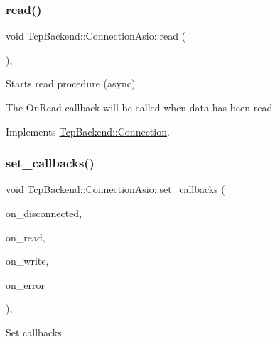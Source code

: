 \subsubsection{\texorpdfstring{read()}{read()}}
{\footnotesize\ttfamily void Tcp\+Backend\+::\+Connection\+Asio\+::read (\begin{DoxyParamCaption}{ }\end{DoxyParamCaption})\hspace{0.3cm}{\ttfamily [override]}, {\ttfamily [virtual]}}



Starts read procedure (async) 

The On\+Read callback will be called when data has been read. 

Implements \hyperlink{classTcpBackend_1_1Connection_a53c7544a1dc738fbf69d8081742f319c}{Tcp\+Backend\+::\+Connection}.

\mbox{\label{classTcpBackend_1_1ConnectionAsio_aee6f9ded99c8382d3daaf2aa3d8890ee}} 
\subsubsection{\texorpdfstring{set\+\_\+callbacks()}{set\_callbacks()}}
{\footnotesize\ttfamily void Tcp\+Backend\+::\+Connection\+Asio\+::set\+\_\+callbacks (\begin{DoxyParamCaption}\item[{const \hyperlink{namespaceTcpBackend_a2ce9b1a1f46bfa6c4b1ad38c8aa262a6}{On\+Disconnected} \&}]{on\+\_\+disconnected,  }\item[{const \hyperlink{namespaceTcpBackend_a7d2c9f63e8017af705255d4ed08264a7}{On\+Read} \&}]{on\+\_\+read,  }\item[{const \hyperlink{namespaceTcpBackend_a670c71abc926680e1ea574a5f3a99135}{On\+Write} \&}]{on\+\_\+write,  }\item[{const \hyperlink{namespaceTcpBackend_a17e8f044749312a6692cd0135565cbc4}{On\+Error} \&}]{on\+\_\+error }\end{DoxyParamCaption})\hspace{0.3cm}{\ttfamily [override]}, {\ttfamily [virtual]}}



Set callbacks. 

